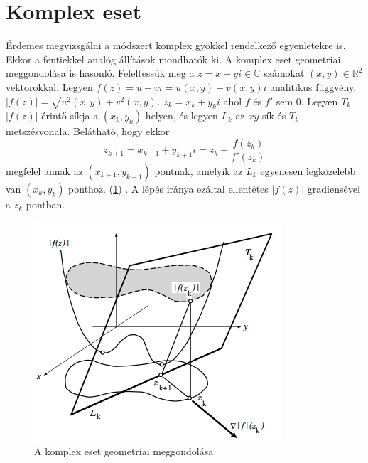 \documentclass[a4paper,12pt]{report}
\begin{document}












		\section{Komplex eset}
			Érdemes megvizsgálni a módszert komplex gyökkel rendelkező egyenletekre is. Ekkor a fentiekkel analóg állítások mondhatók ki. A komplex eset geometriai meggondolása is hasonló. Feleltessük meg a $z=x+yi \in \mathbb{C}$ számokat $(x,y)\in\mathbb{R}^2$ vektorokkal. Legyen $f(z)=u+vi=u(x,y)+v(x,y)i$ analitikus függvény. $|f(z)|=\sqrt{u^2(x,y)+v^2(x,y)}$. $z_k=x_k+y_ki$ ahol $f$ és $f'$ sem 0. Legyen $T_k$ $|f(z)|$ érintő síkja a $(x_k,y_k)$ helyen, és legyen $L_k$ az $xy$ sík és $T_k$ metszésvonala. Belátható, hogy ekkor \[z_{k+1}=x_{k+1}+y_{k+1}i=z_k-\frac{f(z_k)}{f'(z_k)}\] megfelel annak az $(x_{k+1},y_{k+1})$ pontnak, amelyik az $L_k$ egyenesen legközelebb van $(x_k,y_k)$ ponthoz. (\ref{k6}) \cite[p. 809]{Yau98}. A lépés iránya ezáltal ellentétes $|f(z)|$ gradiensével a $z_k$ pontban.

			 \begin{figure}[ht]
				\begin{center}
				\includegraphics[scale=0.7]{kepek/kep6.png}
				\caption{A komplex eset geometriai meggondolása \cite[p. 807]{Yau98}} \label{k6}
				\end{center}
			\end{figure}
\end{document}
